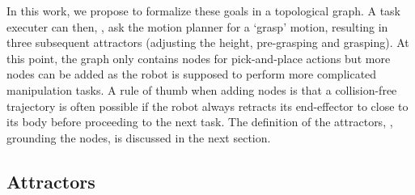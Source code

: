 In this work, we propose to formalize these goals in a topological graph. A task executer can then, \eg, ask the motion planner for a `grasp' motion, resulting in three subsequent attractors (adjusting the height, pre-grasping and grasping). 
At this point, the graph only contains nodes for pick-and-place actions but more nodes can be added as the robot is supposed to perform more complicated manipulation tasks. A rule of thumb when adding nodes is that a collision-free trajectory is often possible if the robot always retracts its end-effector to close to its body before proceeding to the next task. The definition of the attractors, \ie, grounding the nodes, is discussed in the next section.

\subsection{Attractors}\label{wbp:ssec:constraints}
